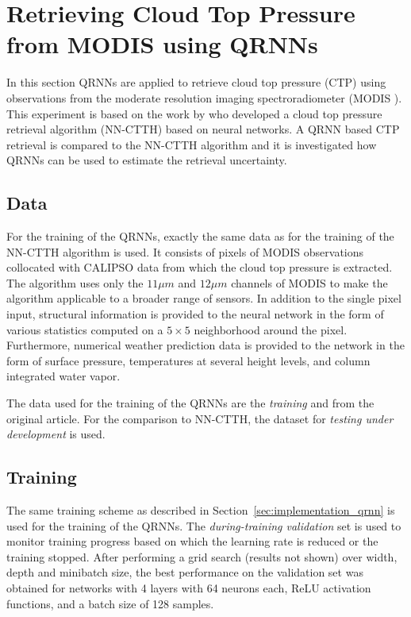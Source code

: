 \documentclass[journal abbreviation, manuscript]{copernicus}
\begin{document}
\section{Retrieving Cloud Top Pressure from MODIS using QRNNs}
\label{sec:ctp}

In this section QRNNs are applied to retrieve cloud top pressure (CTP) using
observations from the moderate resolution imaging spectroradiometer (MODIS 
\citep{modis}). This experiment is based on the work by \cite{hakansson} who
developed a cloud top pressure retrieval algorithm (NN-CTTH) based on neural
networks. A QRNN based CTP retrieval is compared to the NN-CTTH algorithm and it
is investigated how QRNNs can be used to estimate the retrieval uncertainty.

\subsection{Data}

For the training of the QRNNs, exactly the same data as for the training of the
NN-CTTH algorithm is used. It consists of pixels of MODIS observations
collocated with CALIPSO \citep{calipso} data from which the cloud top pressure
is extracted. The algorithm uses only the $11 \unit{\mu m}$ and $12\unit{\mu m}$
channels of MODIS to make the algorithm applicable to a broader range of
sensors. In addition to the single pixel input, structural information is
provided to the neural network in the form of various statistics computed on a
$5 \times 5$ neighborhood around the pixel. Furthermore, numerical weather
prediction data is provided to the network in the form of surface pressure,
temperatures at several height levels, and column integrated water
vapor.

The data used for the training of the QRNNs are the \textit{training} and
 from the original article. For the
comparison to NN-CTTH, the dataset for \textit{testing under development} is
used.

\subsection{Training}

The same training scheme as described in Section~\ref{sec:implementation_qrnn}
is used for the training of the QRNNs. The \textit{during-training validation} set is used
to monitor training progress based on which the learning rate is reduced or the
training stopped. After performing a grid search (results not shown) over width,
depth and minibatch size, the best performance on the validation set was
obtained for networks with 4 layers with 64 neurons each, ReLU activation functions,
 and a batch size of 128 samples.
\end{document}
